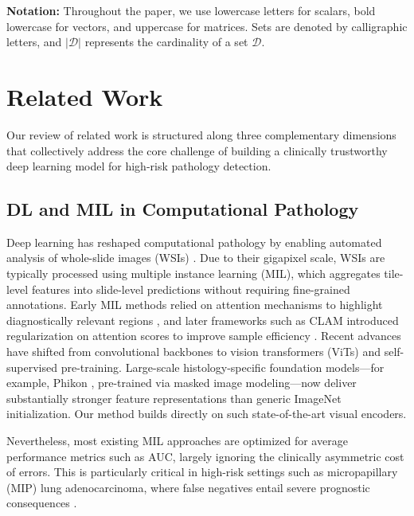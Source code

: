 \documentclass[journal,twoside,web]{ieeecolor}
\begin{document}
\textbf{Notation:}
Throughout the paper, we use lowercase letters for scalars, bold lowercase for vectors, and uppercase for matrices. Sets are denoted by calligraphic letters, and $|\mathcal{D}|$ represents the cardinality of a set $\mathcal{D}$.

\section{Related Work}\label{S6-3}

Our review of related work is structured along three complementary dimensions that collectively address the core challenge of building a clinically trustworthy deep learning model for high-risk pathology detection.

\subsection{DL and MIL in Computational Pathology}

Deep learning has reshaped computational pathology by enabling automated analysis of whole-slide images (WSIs) \cite{coudray2018classification, campanella2019clinical}. Due to their gigapixel scale, WSIs are typically processed using multiple instance learning (MIL), which aggregates tile-level features into slide-level predictions without requiring fine-grained annotations. Early MIL methods relied on attention mechanisms to highlight diagnostically relevant regions \cite{ilse2018attention}, and later frameworks such as CLAM introduced regularization on attention scores to improve sample efficiency \cite{lu2021data}. Recent advances have shifted from convolutional backbones to vision transformers (ViTs) and self-supervised pre-training. Large-scale histology-specific foundation models—for example, Phikon \cite{filiot2023scaling}, pre-trained via masked image modeling—now deliver substantially stronger feature representations than generic ImageNet initialization. Our method builds directly on such state-of-the-art visual encoders.

Nevertheless, most existing MIL approaches are optimized for average performance metrics such as AUC, largely ignoring the clinically asymmetric cost of errors. This is particularly critical in high-risk settings such as micropapillary (MIP) lung adenocarcinoma, where false negatives entail severe prognostic consequences \cite{caso2020underlying, dai2017tumor, zahari2024mitigating}.
\end{document}
